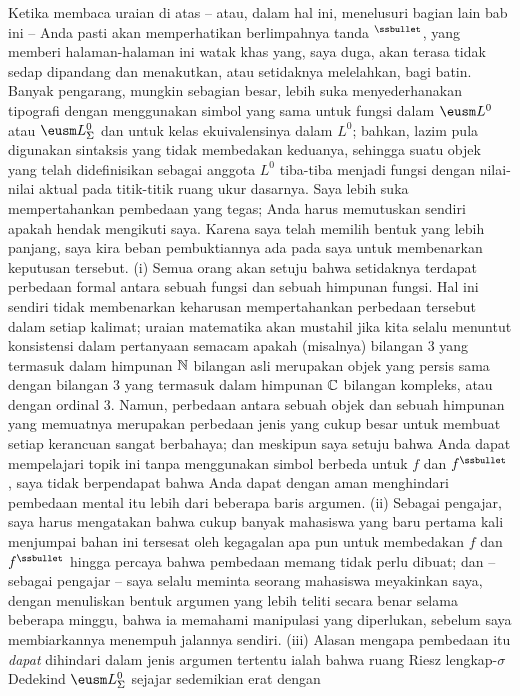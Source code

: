 {Ketika membaca uraian di atas -- atau, dalam hal ini, menelusuri bagian lain
bab ini -- Anda pasti akan memperhatikan berlimpahnya tanda $^{\ssbullet}$,
yang memberi halaman-halaman ini watak khas yang, saya duga, akan terasa
tidak sedap dipandang dan menakutkan, atau setidaknya melelahkan, bagi batin.
Banyak pengarang, mungkin sebagian besar, lebih suka menyederhanakan tipografi
dengan menggunakan simbol yang sama untuk fungsi dalam $\eusm L^0$ atau
$\eusm L^0_{\Sigma}$ dan untuk kelas ekuivalensinya dalam $L^0$; bahkan,
lazim pula digunakan sintaksis yang tidak membedakan keduanya, sehingga suatu
objek yang telah didefinisikan sebagai anggota $L^0$ tiba-tiba menjadi fungsi
dengan nilai-nilai aktual pada titik-titik ruang ukur dasarnya. Saya lebih
suka mempertahankan pembedaan yang tegas; Anda harus memutuskan sendiri apakah
hendak mengikuti saya. Karena saya telah memilih bentuk yang lebih panjang,
saya kira beban pembuktiannya ada pada saya untuk membenarkan keputusan
tersebut. (i) Semua orang akan setuju bahwa setidaknya terdapat perbedaan
formal antara sebuah fungsi dan sebuah himpunan fungsi. Hal ini sendiri tidak
membenarkan keharusan mempertahankan perbedaan tersebut dalam setiap kalimat;
uraian matematika akan mustahil jika kita selalu menuntut konsistensi dalam
pertanyaan semacam apakah (misalnya) bilangan $3$ yang termasuk dalam himpunan
$\Bbb N$ bilangan asli merupakan objek yang persis sama dengan bilangan $3$
yang termasuk dalam himpunan $\Bbb C$ bilangan kompleks, atau dengan ordinal
$3$. Namun, perbedaan antara sebuah objek dan sebuah himpunan yang memuatnya
merupakan perbedaan jenis yang cukup besar untuk membuat setiap kerancuan
sangat berbahaya; dan meskipun saya setuju bahwa Anda dapat mempelajari topik
ini tanpa menggunakan simbol berbeda untuk $f$ dan $f^{\ssbullet}$, saya
tidak berpendapat bahwa Anda dapat dengan aman menghindari pembedaan mental
itu lebih dari beberapa baris argumen. (ii) Sebagai pengajar, saya harus
mengatakan bahwa cukup banyak mahasiswa yang baru pertama kali menjumpai
bahan ini tersesat oleh kegagalan apa pun untuk membedakan $f$ dan
$f^{\ssbullet}$ hingga percaya bahwa pembedaan memang tidak perlu dibuat;
dan -- sebagai pengajar -- saya selalu meminta seorang mahasiswa meyakinkan
saya, dengan menuliskan bentuk argumen yang lebih teliti secara benar selama
beberapa minggu, bahwa ia memahami manipulasi yang diperlukan, sebelum saya
membiarkannya menempuh jalannya sendiri. (iii) Alasan mengapa pembedaan itu
{\it dapat} dihindari dalam jenis argumen tertentu ialah bahwa ruang Riesz
lengkap-$\sigma$ Dedekind $\eusm L^0_{\Sigma}$ sejajar sedemikian erat dengan
}
